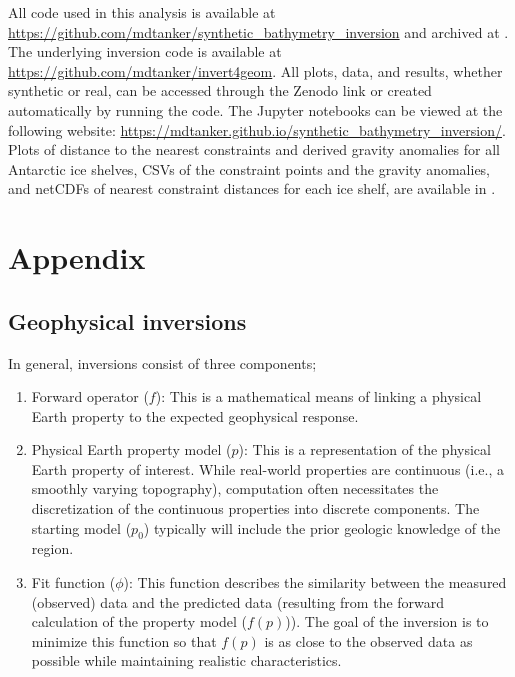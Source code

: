 \documentclass[tc, manuscript]{copernicus}
\begin{document}

\codedataavailability{}All code used in this analysis is available at \url{https://github.com/mdtanker/synthetic_bathymetry_inversion} and archived at \citet{tankersleygravity2025}. The underlying inversion code is available at \url{https://github.com/mdtanker/invert4geom}. All plots, data, and results, whether synthetic or real, can be accessed through the Zenodo link or created automatically by running the code. The Jupyter notebooks can be viewed at the following website: \url{https://mdtanker.github.io/synthetic_bathymetry_inversion/}. Plots of distance to the nearest constraints and derived gravity anomalies for all Antarctic ice shelves, CSVs of the constraint points and the gravity anomalies, and netCDFs of nearest constraint distances for each ice shelf, are available in \citet{tankersleygravity2025}.

\appendix

\section{Appendix}
\subsection{Geophysical inversions}\label{app:inversion}

In general, inversions consist of three components;

\begin{enumerate}
    \item Forward operator ($f$): This is a mathematical means of linking a physical Earth property to the expected geophysical response.
    \item Physical Earth property model ($p$): This is a representation of the physical Earth property of interest. While real-world properties are continuous (i.e., a smoothly varying topography), computation often necessitates the discretization of the continuous properties into discrete components. The starting model ($p_0$) typically will include the prior geologic knowledge of the region.
    \item Fit function ($\phi$): This function describes the similarity between the measured (observed) data and the predicted data (resulting from the forward calculation of the property model ($f(p)$)). The goal of the inversion is to minimize this function so that $f(p)$ is as close to the observed data as possible while maintaining realistic characteristics.
\end{enumerate}
\end{document}
